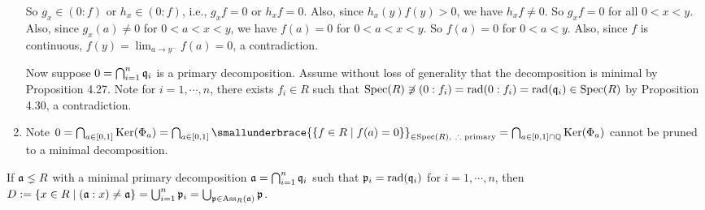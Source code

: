 \begin{example}
\begin{enumerate}
\begin{center}
            \end{center}
            So $g_x \in (0:f)$ or $h_x \in (0:f)$, i.e., $g_xf = 0$ or $h_xf =  0$. Also, since $h_x(y)f(y) > 0$, we have $h_xf \neq 0$. So $g_xf = 0$ for all $0 < x < y$. Also, since $g_x(a) \neq 0$ for $0 < a < x < y$, we have $f(a) = 0$ for $0 < a < x < y$. So $f(a) = 0$ for $0 < a < y$. Also, since $f$ is continuous, $f(y) = \lim_{a \to y^{-}}f(a) = 0$, a contradiction. \par 
            Now suppose $0 = \bigcap_{i=1}^{n}\mathfrak{q}_i$ is a primary decomposition. Assume without loss of generality that the decomposition is minimal by Proposition 4.27. Note for $i = 1,\cdots,n$, there exists $f_i \in R$ such that $\operatorname{Spec}(R) \not \ni (0:f_i) = \operatorname{rad}(0:f_i) = \operatorname{rad}(\mathfrak{q}_i) \in \operatorname{Spec}(R)$ by Proposition 4.30, a contradiction. 
        \item Note $0 = \bigcap_{a \in [0,1]} \ker(\Phi_a) = \bigcap_{a \in [0,1]} \smallunderbrace{\{f \in R \mid f(a) = 0\}}_{\in \operatorname{Spec}(R),\ \therefore \text{ primary}} = \bigcap_{a \in [0,1] \cap \bbQ} \ker(\Phi_a)$ cannot be pruned to a minimal decomposition.
    \end{enumerate}
\end{example}

\begin{proposition}
    If $\mathfrak{a} \lneq R$ with a minimal primary decomposition $\mathfrak{a} = \bigcap_{i=1}^{n} \mathfrak{q}_i$ such that $\mathfrak{p}_i = \operatorname{rad}(\mathfrak{q}_i)$ for $i = 1,\cdots,n$, then $D := \{x \in R \mid (\mathfrak{a}:x) \neq \mathfrak{a}\} = \bigcup_{i=1}^{n} \mathfrak{p}_i = \bigcup_{\mathfrak{p} \in \operatorname{Ass}_R(\mathfrak{a})} \mathfrak{p}$.
\end{proposition}

